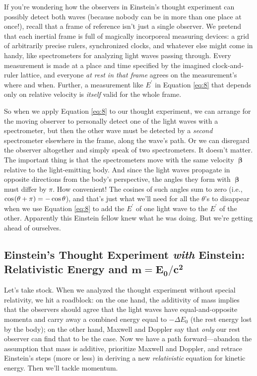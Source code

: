 \documentclass[12pt]{article}
\newcommand{\vvbeta}{\bm{\upbeta}}
\begin{document}
If you're wondering how the observers in Einstein's thought experiment can possibly detect both waves (because nobody can be in more than one place at once!), recall that a frame of reference isn't just a single observer. We pretend that each inertial frame is full of magically incorporeal measuring devices: a grid of arbitrarily precise rulers, synchronized clocks, and whatever else might come in handy, like spectrometers for analyzing light waves passing through. Every measurement is made at a place and time specified by the imagined clock-and-ruler lattice, and everyone \emph{at rest in that frame} agrees on the measurement's where and when. Further, a measurement like $E^\prime$ in Equation \ref{eq:8} that depends only on relative velocity is \emph{itself} valid for the whole frame.

So when we apply Equation \ref{eq:8} to our thought experiment, we can arrange for the moving observer to personally detect one of the light waves with a spectrometer, but then the other wave must be detected by a \emph{second} spectrometer elsewhere in the frame, along the wave's path. Or we can disregard the observer altogether and simply speak of two spectrometers. It doesn't matter. The important thing is that the spectrometers move with the same velocity $\vvbeta$ relative to the light-emitting body. And since the light waves propagate in opposite directions from the body's perspective, the angles they form with $\vvbeta$ must differ by $\pi$. How convenient! The cosines of such angles sum to zero (i.e., $\cos \mkern1.5mu (\theta+\pi)=-\cos\theta$), and that's just what we'll need for all the $\theta$'s to disappear when we use Equation \ref{eq:8} to add the $E^{\prime}$ of one light wave to the $E^{\prime}$ of the other. Apparently this Einstein fellow knew what he was doing. But we're getting ahead of ourselves.


\subsection[Einstein's Thought Experiment \emph{with} Einstein: Relativistic Energy and $m=E_0/c^2$]{Einstein's Thought Experiment \emph{with} Einstein:\\Relativistic Energy and $\bm{m=E_0/c^2}$}\label{ssec:re}

Let's take stock. When we analyzed the thought experiment without special relativity, we hit a roadblock: on the one hand, the additivity of mass implies that the observers should agree that the light waves have equal-and-opposite momenta and carry away a combined energy equal to $-\Delta E_0$ (the rest energy lost by the body); on the other hand, Maxwell and Doppler say that \emph{only} our rest observer can find that to be the case. Now we have a path forward---abandon the assumption that mass is additive, prioritize Maxwell and Doppler, and retrace Einstein's steps (more or less) in deriving a new \emph{relativistic} equation for kinetic energy. Then we'll tackle momentum.
\end{document}
